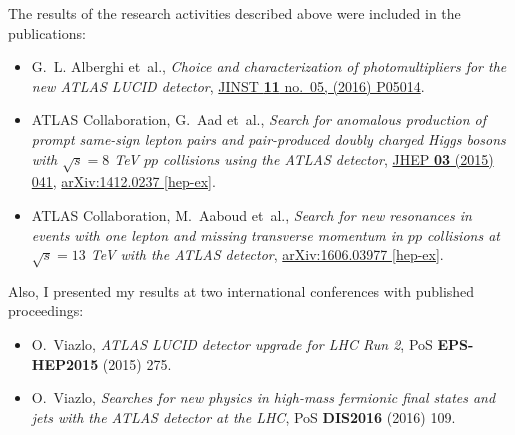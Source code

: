 \begin{preface}
The results of the research activities described above were included in the publications:
\begin{itemize}
\item G.~L. Alberghi {et~al.}, {\em {Choice and characterization of photomultipliers
  for the new ATLAS LUCID detector}},
  \href{http://dx.doi.org/10.1088/1748-0221/11/05/P05014}{JINST {\bfseries 11}
  no.~05, (2016) P05014}.
\item {ATLAS} Collaboration, G.~Aad {et~al.}, {\em {Search for anomalous production
  of prompt same-sign lepton pairs and pair-produced doubly charged Higgs
  bosons with $ \sqrt{s}=8 $ TeV $pp$ collisions using the ATLAS detector}},
  \href{http://dx.doi.org/10.1007/JHEP03(2015)041}{JHEP {\bfseries 03} (2015)
  041},
  \href{http://arxiv.org/abs/1412.0237}{{\ttfamily arXiv:1412.0237 [hep-ex]}}.
\item {ATLAS} Collaboration, M.~Aaboud {et~al.}, {\em {Search for new resonances in
  events with one lepton and missing transverse momentum in $pp$ collisions at
  $\sqrt{s} = 13$ TeV with the ATLAS detector}},
  \href{http://arxiv.org/abs/1606.03977}{{\ttfamily arXiv:1606.03977 [hep-ex]}}.
\end{itemize}

Also, I presented my results at two international conferences with published proceedings:
\begin{itemize}
 \item O.~Viazlo, {\em {ATLAS LUCID detector upgrade for LHC Run 2}},
PoS {\bfseries EPS-HEP2015} (2015) 275.
 \item O.~Viazlo, {\em {Searches for new physics in high-mass
  fermionic final states and jets with the ATLAS detector at the LHC}},
PoS {\bfseries DIS2016} (2016) 109.
\end{itemize}













\end{preface}
